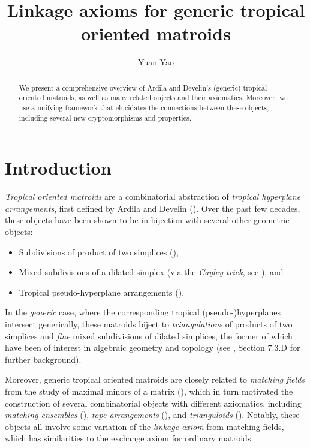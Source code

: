 \documentclass[letterpaper,reqno,11pt]{amsart}
\title{Linkage axioms for generic tropical oriented matroids}
\author{Yuan Yao}
\begin{document}
\begin{abstract}
    We present a comprehensive overview of Ardila and Develin's (generic) tropical oriented matroids, as well as many related objects and their axiomatics. Moreover, we use a unifying framework that elucidates the connections between these objects, including several new cryptomorphisms and properties.
\end{abstract}

\maketitle

\section{Introduction}\label{sec:intro}

\emph{Tropical oriented matroids} are a combinatorial abstraction of \emph{tropical hyperplane arrangements}, first defined by Ardila and Develin (\cite{TropicalOM}). Over the past few decades, these objects have been shown to be in bijection with several other geometric objects:

\begin{itemize}
    \item Subdivisions of product of two simplices (\cite{TropicalOM, TriangulationTOM, TropoRep}),
    \item Mixed subdivisions of a dilated simplex (via the \emph{Cayley trick}, see \cite{CayleyZono, CayleyTri}), and
    \item Tropical pseudo-hyperplane arrangements (\cite{TropoRep}).
\end{itemize}

In the \emph{generic} case, where the corresponding tropical (pseudo-)hyperplanes intersect generically, these matroids biject to \emph{triangulations} of products of two simplices and \emph{fine} mixed subdivisions of dilated simplices, the former of which have been of interest in algebraic geometry and topology (see \cite{Discriminants}, Section 7.3.D for further background).

Moreover, generic tropical oriented matroids are closely related to \emph{matching fields} from the study of maximal minors of a matrix (\cite{MaxMinors, Fields}), which in turn motivated the construction of several combinatorial objects with different axiomatics, including \emph{matching ensembles} (\cite{Ensembles}), \emph{tope arrangements} (\cite{FieldLattice}), and \emph{trianguloids} (\cite{Trianguloids}). Notably, these objects all involve some variation of the \emph{linkage axiom} from matching fields, which has similarities to the exchange axiom for ordinary matroids.
\end{document}
